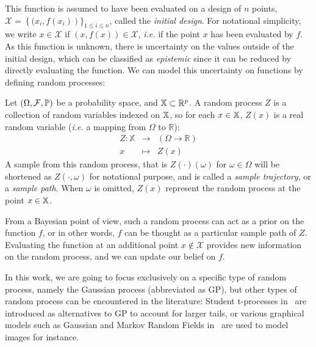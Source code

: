 \documentclass[../../Main_ManuscritThese.tex]{subfiles}
\begin{document}
This function is assumed to have been evaluated on a design of $n$ points, $\mathcal{X} = \left\{ (x_i, f(x_i) \right)\}_{1\leq i\leq n}$, called the \emph{initial design}. For notational simplicity, we write $x\in \mathcal{X}$ if $(x, f(x)) \in \mathcal{X}$, \textit{i.e.} if the point $x$ has been evaluated by $f$.
As this function is unknown, there is uncertainty on the values outside of the initial design, which can be classified as \emph{epistemic} since it can be reduced by directly evaluating the function.
We can model this uncertainty on functions by defining random processes:
\begin{definition}
  Let $(\Omega, \mathcal{F}, \mathbb{P})$ be a probability space, and $\mathbb{X}\subset \mathbb{R}^p$.
  A random process $Z$ is a collection of random variables indexed on $\mathbb{X}$, so for each $x \in \mathbb{X}$, $Z(x)$ is a real random variable (\textit{i.e.} a mapping from $\Omega$ to $\mathbb{R}$):
 \begin{equation}
  \begin{array}{rcl}
    Z: \mathbb{X} & \longrightarrow & \left(\Omega \rightarrow \mathbb{R} \right)\\
    x& \longmapsto & Z(x)
  \end{array}
\end{equation}
A sample from this random process, that is $Z(\cdot)(\omega)$ for $\omega \in \Omega$ will be shortened as $Z(\cdot, \omega)$ for notational purpose, and is called a \emph{sample trajectory}, or a \emph{sample path}.
When $\omega$ is omitted, $Z(x)$ represent the random process at the point $x \in \mathbb{X}$.
\end{definition}
From a Bayesian point of view, such a random process can act as a prior on the function $f$, or in other words, $f$ can be thought as a particular sample path of $Z$.
Evaluating the function at an additional point $x \notin \mathcal{X}$ provides new information on the random process, and we can update our belief on $f$.


In this work, we are going to focus exclusively on a specific type of random process, namely the Gaussian process (abbreviated as GP), but other types of random process can be encountered in the literature: Student t-processes in~\cite{shah_student-t_2014} are introduced as alternatives to GP to account for larger tails, or various graphical models such as Gaussian and Markov Random Fields in~\cite{bishop_pattern_2006,li_markov_2009} are used to model images for instance.
\end{document}
